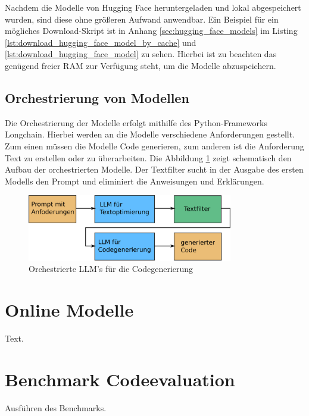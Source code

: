 Nachdem die Modelle von Hugging Face heruntergeladen und lokal abgespeichert wurden, sind diese ohne größeren Aufwand anwendbar. Ein Beispiel für ein mögliches Download-Skript ist in Anhang \ref{sec:hugging_face_models} im Listing \ref{lst:download_hugging_face_model_by_cache} und \ref{lst:download_hugging_face_model} zu sehen. Hierbei ist zu beachten das genügend freier RAM zur Verfügung steht, um die Modelle abzuspeichern.



\subsection{Orchestrierung von Modellen}
Die Orchestrierung der Modelle erfolgt mithilfe des Python-Frameworks Longchain. Hierbei werden an die Modelle verschiedene Anforderungen gestellt. Zum einen müssen die Modelle Code generieren, zum anderen ist die Anforderung Text zu erstellen oder zu überarbeiten. Die Abbildung \ref{img:orchestration_llms} zeigt schematisch den Aufbau der orchestrierten Modelle. Der Textfilter sucht in der Ausgabe des ersten Modells den Prompt und eliminiert die Anweisungen und Erklärungen.

\begin{figure}[!ht]
	\includegraphics[width=0.8\textwidth]{content/chapter_implementation/images/orchestrierung_llms.eps}
	\centering
	\caption{Orchestrierte LLM's für die Codegenerierung}
	\label{img:orchestration_llms}
\end{figure}



\section{Online Modelle}
Text.

\section{Benchmark Codeevaluation}\label{sec:benchmark_evaluation}
Ausführen des Benchmarks.


